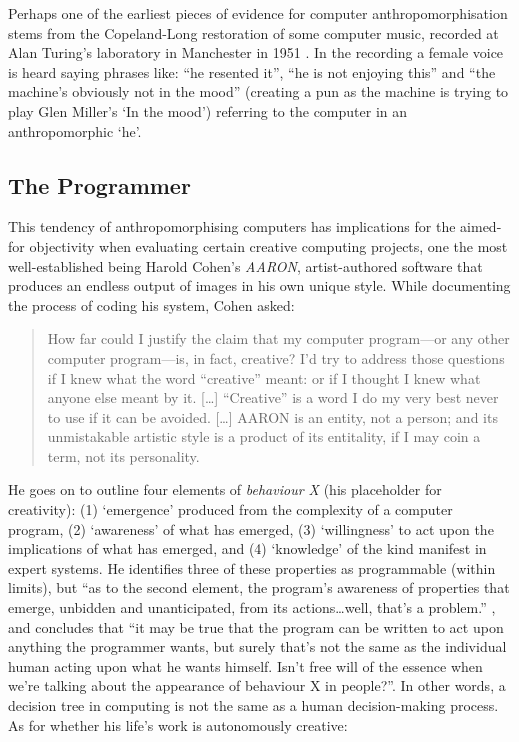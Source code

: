 Perhaps one of the earliest pieces of evidence for computer anthropomorphisation stems from the Copeland-Long restoration of some computer music, recorded at Alan Turing's laboratory in Manchester in 1951 \autocite{Copeland2016}. In the recording a female voice is heard saying phrases like: ``he resented it'', ``he is not enjoying this'' and ``the machine's obviously not in the mood'' (creating a pun as the machine is trying to play Glen Miller's `In the mood') referring to the computer in an anthropomorphic `he'.


\subsection{The Programmer}
\label{s:programmer}

This tendency of anthropomorphising computers has implications for the aimed-for objectivity when evaluating certain creative computing projects, one the most well-established being Harold Cohen's \textit{AARON}, artist-authored software that produces an endless output of images in his own unique style. While documenting the process of coding his system, Cohen asked:

\begin{quotation}
  How far could I justify the claim that my computer program---or any other computer program---is, in fact, creative? I'd try to address those questions if I knew what the word ``creative'' meant: or if I thought I knew what anyone else meant by it. [\ldots] ``Creative'' is a word I do my very best never to use if it can be avoided. [\ldots] AARON is an entity, not a person; and its unmistakable artistic style is a product of its entitality, if I may coin a term, not its personality. 
\end{quotation}

He goes on to outline four elements of \emph{behaviour X} (his placeholder for creativity): (1) `emergence' produced from the complexity of a computer program, (2) `awareness' of what has emerged, (3) `willingness' to act upon the implications of what has emerged, and (4) `knowledge' of the kind manifest in expert systems. He identifies three of these properties as programmable (within limits), but ``as to the second element, the program\rq s awareness of properties that emerge, unbidden and unanticipated, from its actions\ldots  well, that\rq s a problem.'' \autocite{Cohen1999}, and concludes that ``it may be true that the program can be written to act upon anything the programmer wants, but surely that\rq s not the same as the individual human acting upon what he wants himself. Isn\rq t free will of the essence when we\rq re talking about the appearance of behaviour X in people?''. In other words, a decision tree in computing is not the same as a human decision-making process. As for whether his life's work is autonomously creative:

